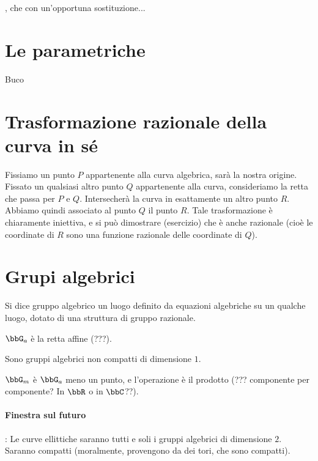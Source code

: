 , che con un'opportuna sostituzione...

\section{Le parametriche}
Buco

\section{Trasformazione razionale della curva in sé}
Fissiamo un punto $P$ appartenente alla curva algebrica, sarà la nostra origine. Fissato un qualsiasi altro punto $Q$
appartenente alla curva, consideriamo la retta che passa per $P$ e $Q$. Intersecherà la curva in esattamente un altro punto $R$.
Abbiamo quindi associato al punto $Q$ il punto $R$. Tale trasformazione è chiaramente iniettiva, e si può dimostrare (esercizio)
che è anche razionale (cioè le coordinate di $R$ sono una funzione razionale delle coordinate di $Q$).

\section{Grupi algebrici}
\begin{definizione}
Si dice gruppo algebrico un luogo definito da equazioni algebriche 
su un qualche luogo, dotato di una struttura di gruppo razionale.
\end{definizione}

\begin{definizione}
$\bbG_a$ è la retta affine (???).
\end{definizione}

\begin{osservazione}
Sono gruppi algebrici non compatti di dimensione $1$.
\end{osservazione}

\begin{definizione}
$\bbG_m$ è $\bbG_a$ meno un punto, e l'operazione è il prodotto (??? componente per componente?
In $\bbR$ o in $\bbC$??).
\end{definizione}


\paragraph{Finestra sul futuro}:
Le curve ellittiche saranno tutti e soli i gruppi algebrici di dimensione $2$. Saranno compatti
(moralmente, provengono da dei tori, che sono compatti).


